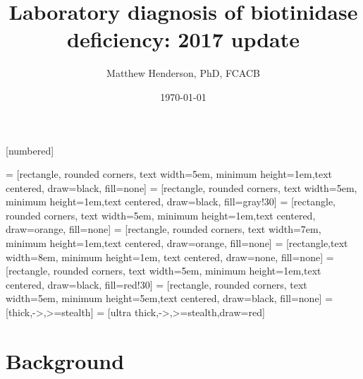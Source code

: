 \documentclass[presentation, smaller]{beamer}
\author{Matthew Henderson, PhD, FCACB}
\date{\today}
\title{Laboratory diagnosis of biotinidase deficiency: 2017 update}
\institute[NSO]{Newborn Screening Ontario}
\begin{document}
\maketitle


\vspace{220pt}
\beamertemplatenavigationsymbolsempty
{}[numbered]


 = [rectangle, rounded corners, text width=5em, minimum height=1em,text centered, draw=black, fill=none]
 = [rectangle, rounded corners, text width=5em, minimum height=1em,text centered, draw=black, fill=gray!30]
 = [rectangle, rounded corners, text width=5em, minimum height=1em,text centered, draw=orange, fill=none]
 = [rectangle, rounded corners, text width=7em, minimum height=1em,text centered, draw=orange, fill=none]
 = [rectangle,text width=8em, minimum height=1em, text centered, draw=none, fill=none]
 = [rectangle, rounded corners, text width=5em, minimum height=1em,text centered, draw=black, fill=red!30]
 = [rectangle, rounded corners, text width=5em, minimum height=5em,text centered, draw=black, fill=none]
 = [thick,->,>=stealth]
 = [ultra thick,->,>=stealth,draw=red]


\section{Background}
\label{sec:orgheadline8}
\end{document}
